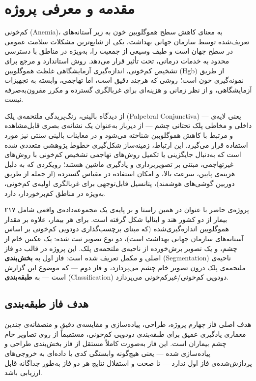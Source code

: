 \section{مقدمه و معرفی پروژه}
\label{sec:introduction}

کم‌خونی (Anemia)، به معنای کاهش سطح هموگلوبین خون به زیر آستانه‌های تعریف‌شده توسط سازمان جهانی بهداشت، یکی از شایع‌ترین مشکلات سلامت عمومی در سطح جهان است و طیف وسیعی از جمعیت را، به‌ویژه در مناطق با دسترسی محدود به خدمات درمانی، تحت تأثیر قرار می‌دهد. روش استاندارد و مرجع برای تشخیص کم‌خونی، اندازه‌گیری آزمایشگاهی غلظت هموگلوبین (Hgb) از طریق نمونه‌گیری خون است؛ روشی که هرچند دقیق است، اما تهاجمی، وابسته به تجهیزات آزمایشگاهی، و از نظر زمانی و هزینه‌ای برای غربالگری گسترده و مکرر مقرون‌به‌صرفه نیست.

از دیدگاه بالینی، رنگ‌پریدگی ملتحمه‌ی پلک (Palpebral Conjunctiva) — یعنی لایه‌ی داخلی و مخاطی پلک تحتانی چشم — از دیرباز به‌عنوان یک نشانه‌ی بصری قابل‌مشاهده و مرتبط با کاهش هموگلوبین شناخته می‌شود و در معاینات بالینی سنتی نیز مورد استفاده قرار می‌گیرد. این ارتباط، زمینه‌ساز شکل‌گیری خطوط پژوهشی متعددی شده است که به‌دنبال جایگزینی یا تکمیل روش‌های تهاجمی تشخیص کم‌خونی با روش‌های غیرتهاجمی، مبتنی بر تصویربرداری و یادگیری ماشین هستند؛ رویکردی که به دلیل هزینه‌ی پایین، سرعت بالا، و امکان استفاده در مقیاس گسترده (از جمله از طریق دوربین گوشی‌های هوشمند)، پتانسیل قابل‌توجهی برای غربالگری اولیه‌ی کم‌خونی، به‌ویژه در مناطق کم‌برخوردار، دارد.

پروژه‌ی حاضر با عنوان  در همین راستا و بر پایه‌ی یک مجموعه‌داده‌ی واقعی شامل ۲۱۷ بیمار از دو کشور هند و ایتالیا شکل گرفته است. برای هر بیمار، علاوه بر مقدار هموگلوبین اندازه‌گیری‌شده (که مبنای برچسب‌گذاری دودویی کم‌خونی بر اساس آستانه‌های سازمان جهانی بهداشت است)، دو نوع تصویر ثبت شده: یک عکس خام از چشم، و یک تصویر برش‌خورده از ناحیه‌ی ملتحمه‌ی پلک. این پروژه در قالب دو فاز اصلی و مکمل تعریف شده است: فاز اول به \textbf{بخش‌بندی} (Segmentation) ناحیه‌ی ملتحمه‌ی پلک درون تصویر خام چشم می‌پردازد، و فاز دوم — که موضوع این گزارش است — به \textbf{طبقه‌بندی} (Classification) دودویی کم‌خونی/غیرکم‌خونی می‌پردازد.

\subsection{هدف فاز طبقه‌بندی}
\label{subsec:classification-goal}

هدف اصلی فاز چهارم پروژه، طراحی، پیاده‌سازی و مقایسه‌ی دقیق و منصفانه‌ی چندین معماری یادگیری عمیق برای طبقه‌بندی دودویی کم‌خونی، مستقیماً از روی تصاویر خام چشم بیماران است. این فاز به‌صورت کاملاً مستقل از فاز بخش‌بندی طراحی و پیاده‌سازی شده — یعنی هیچ‌گونه وابستگی کدی یا داده‌ای به خروجی‌های پردازش‌شده‌ی فاز اول ندارد — تا صحت و استقلال نتایج هر دو فاز به‌طور جداگانه قابل ارزیابی باشد.

